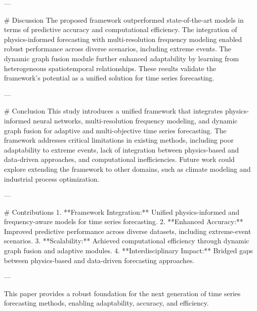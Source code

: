 ---

# Discussion  
The proposed framework outperformed state-of-the-art models in terms of predictive accuracy and computational efficiency. The integration of physics-informed forecasting with multi-resolution frequency modeling enabled robust performance across diverse scenarios, including extreme events. The dynamic graph fusion module further enhanced adaptability by learning from heterogeneous spatiotemporal relationships. These results validate the framework's potential as a unified solution for time series forecasting.

---

# Conclusion  
This study introduces a unified framework that integrates physics-informed neural networks, multi-resolution frequency modeling, and dynamic graph fusion for adaptive and multi-objective time series forecasting. The framework addresses critical limitations in existing methods, including poor adaptability to extreme events, lack of integration between physics-based and data-driven approaches, and computational inefficiencies. Future work could explore extending the framework to other domains, such as climate modeling and industrial process optimization.

---

# Contributions  
1. **Framework Integration:** Unified physics-informed and frequency-aware models for time series forecasting.  
2. **Enhanced Accuracy:** Improved predictive performance across diverse datasets, including extreme-event scenarios.  
3. **Scalability:** Achieved computational efficiency through dynamic graph fusion and adaptive modules.  
4. **Interdisciplinary Impact:** Bridged gaps between physics-based and data-driven forecasting approaches.  

--- 

This paper provides a robust foundation for the next generation of time series forecasting methods, enabling adaptability, accuracy, and efficiency.